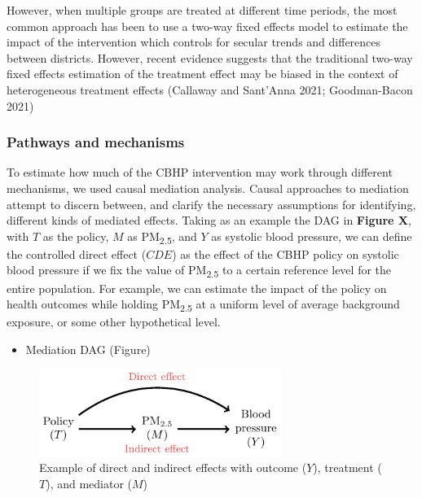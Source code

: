 \documentclass[
  letterpaper,
  DIV=11,
  numbers=noendperiod]{scrartcl}
\providecommand{\tightlist}{%
  \setlength{\itemsep}{0pt}\setlength{\parskip}{0pt}}\usepackage{longtable,booktabs,array}
\begin{document}
However, when multiple groups are treated at different time periods, the
most common approach has been to use a two-way fixed effects model to
estimate the impact of the intervention which controls for secular
trends and differences between districts. However, recent evidence
suggests that the traditional two-way fixed effects estimation of the
treatment effect may be biased in the context of heterogeneous treatment
effects (Callaway and Sant'Anna 2021; Goodman-Bacon 2021)

\subsubsection{Pathways and mechanisms}\label{pathways-and-mechanisms}

To estimate how much of the CBHP intervention may work through different
mechanisms, we used causal mediation analysis. Causal approaches to
mediation attempt to discern between, and clarify the necessary
assumptions for identifying, different kinds of mediated effects. Taking
as an example the DAG in \textbf{Figure X}, with \(T\) as the policy,
\(M\) as PM\textsubscript{2.5}, and \(Y\) as systolic blood pressure, we
can define the controlled direct effect (\(CDE\)) as the effect of the
CBHP policy on systolic blood pressure if we fix the value of
PM\textsubscript{2.5} to a certain reference level for the entire
population. For example, we can estimate the impact of the policy on
health outcomes while holding PM\textsubscript{2.5} at a uniform level
of average background exposure, or some other hypothetical level.

\begin{itemize}
\tightlist
\item
  Mediation DAG (Figure)
\end{itemize}

\begin{figure}

{\centering \includegraphics[width=0.7\textwidth,height=\textheight]{hei-report_files/figure-pdf/dag1-1.pdf}

}

\caption{Example of direct and indirect effects with outcome (\(Y\)),
treatment (\(T\)), and mediator (\(M\))}

\end{figure}%
\end{document}

